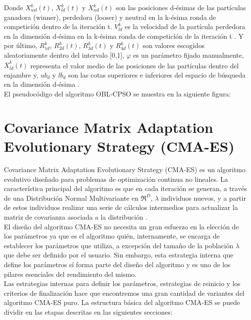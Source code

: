 Donde $X^{k}_{wd}(t)$, $ X^{k}_{ld}(t)$ y $ X^{k}_{nd}(t)$ son las posiciones d-ésimas de las partículas ganadora (winner), perdedora (looser) y neutral en la k-ésima ronda de competición dentro de la iteración t. $V^{k}_{ld}$ es la velocidad de la partícula perdedora en la dimensión d-ésima en la k-ésima ronda de competición de la iteración t \cite{oblcpso}. Y por último, $R^{k}_{1d}$, $R^{k}_{2d}(t)$, $R^{k}_{3d}(t)$ y $R^{k}_{4d}(t)$ son valores escogidos aleatoriamente dentro del intervalo [0,1], $\varphi$ es un parámetro fijado manualmente, $\overline{X}^{k}_{ld}(t)$ representa el valor medio de las posiciones de las partículas dentro del enjambre y, $ub_{d}$ y $lb_{d}$ son las cotas superiores e inferiores del espacio de búsqueda en la dimensión d-ésima \cite{oblcpso}. \\
El pseudocódigo del algoritmo OBL-CPSO se muestra en la siguiente figura: 



\section{Covariance Matrix Adaptation Evolutionary Strategy (CMA-ES)}
\label{sec:CMA}

Covariance Matrix Adaptation Evolutionary Strategy (CMA-ES) \cite{CMA1, CMA2, CMA} es un algoritmo evolutivo diseñado para problemas de optimización continua no lineales. 
La característica principal del algoritmo es que en cada iteración se generan, a través de una Distribución Normal Multivariante en $\Re^{D}$, $\lambda$ individuos nuevos, y a partir de estos individuos realizar una serie de cálculos intermedios para actualizar la matriz de covarianza asociada a la distribución \cite{CMA1}. \\  
El diseño del algoritmo CMA-ES no necesita un gran esfuerzo en la elección de los parámetros ya que es el algoritmo quién, internamente, se encarga de establecer los parámetros que utiliza, a excepción del tamaño de la población $\lambda$ que debe ser definido por el usuario. Sin embargo, esta estrategia interna que define los parámetros sí forma parte del diseño del algoritmo y es uno de los pilares esenciales del rendimiento del mismo. \\

Las estrategias internas para definir los parámetros, estrategias de reinicio y los criterios de finalización hace que encontremos una gran cantidad de variantes del algoritmo CMA-ES puro. La estructura básica del algoritmo CMA-ES se puede dividir en las etapas descritas en las siguientes secciones: \\ 

